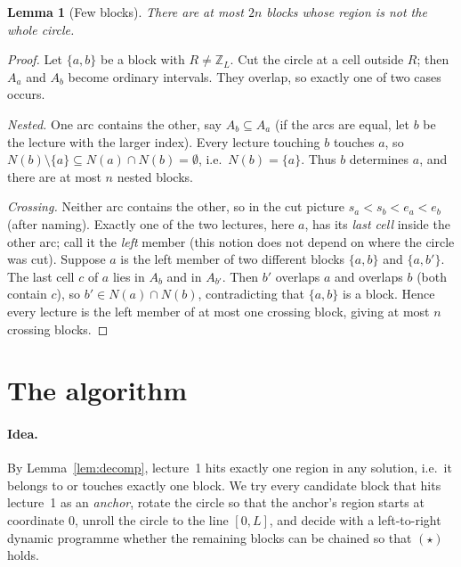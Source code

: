 \documentclass[11pt,a4paper]{article}
\newtheorem{lemma}{Lemma}
\theoremstyle{definition}
\theoremstyle{remark}
\newcommand{\Z}{\mathbb{Z}}
\begin{document}
\begin{lemma}[Few blocks]\label{lem:few}
There are at most $2n$ blocks whose region is not the whole circle.
\end{lemma}
\begin{proof}
Let $\{a,b\}$ be a block with $R\ne\Z_L$.  Cut the circle at a cell outside $R$; then
$A_a$ and $A_b$ become ordinary intervals.  They overlap, so exactly one of two cases
occurs.

\emph{Nested.} One arc contains the other, say $A_b\subseteq A_a$ (if the arcs are equal,
let $b$ be the lecture with the larger index).  Every lecture touching $b$ touches $a$,
so $N(b)\setminus\{a\}\subseteq N(a)\cap N(b)=\emptyset$, i.e.\ $N(b)=\{a\}$.  Thus
$b$ determines $a$, and there are at most $n$ nested blocks.

\emph{Crossing.} Neither arc contains the other, so in the cut picture
$s_a<s_b<e_a<e_b$ (after naming).  Exactly one of the two lectures, here $a$, has its
\emph{last cell} inside the other arc; call it the \emph{left} member (this notion does
not depend on where the circle was cut).  Suppose $a$ is the left member of two
different blocks $\{a,b\}$ and $\{a,b'\}$.  The last cell $c$ of $a$ lies in $A_b$ and
in $A_{b'}$.  Then $b'$ overlaps $a$ and overlaps $b$ (both contain $c$), so
$b'\in N(a)\cap N(b)$, contradicting that $\{a,b\}$ is a block.  Hence every lecture is
the left member of at most one crossing block, giving at most $n$ crossing blocks.
\end{proof}

\section{The algorithm}\label{sec:algo}
\paragraph{Idea.} By Lemma~\ref{lem:decomp}, lecture~1 hits exactly one region in any
solution, i.e.\ it belongs to or touches exactly one block.  We try every candidate
block that hits lecture~1 as an \emph{anchor}, rotate the circle so that the anchor's
region starts at coordinate $0$, unroll the circle to the line $[0,L]$, and decide with a
left-to-right dynamic programme whether the remaining blocks can be chained so that
$(\star)$ holds.
\end{document}
